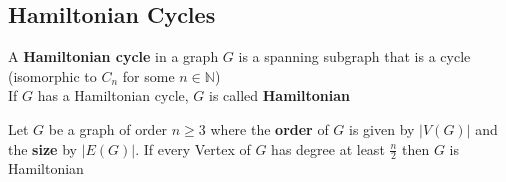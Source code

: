 \subsection{Hamiltonian Cycles}

\begin{definition}
    A \textbf{Hamiltonian cycle} in a graph $G$ is a spanning subgraph that is a cycle (isomorphic to $C_n$ for some $n\in\mathbb{N}$)\\
    If $G$ has a Hamiltonian cycle, $G$ is called \textbf{Hamiltonian} 
\end{definition}

\vspace{0.5cm}

\begin{theorem}
    Let $G$ be a graph of order $n\geq 3$ where the \textbf{order} of $G$ is given by $|V(G)|$ and the \textbf{size} by $|E(G)|$. If every Vertex of $G$ has degree at least $\frac{n}{2}$ then $G$ is Hamiltonian 
\end{theorem}

\vspace{0.5cm}

